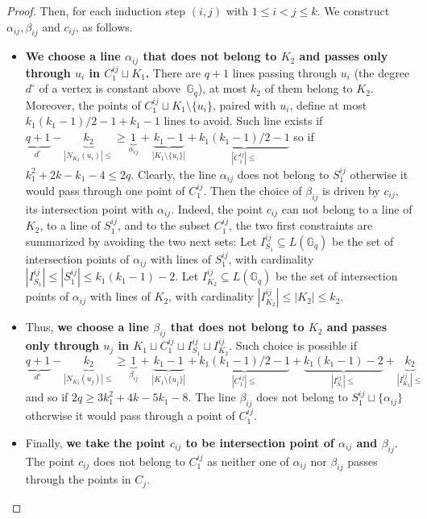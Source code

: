 \documentclass[a4paper,UKenglish,cleveref, autoref, thm-restate]{arxiv}
\newcommand{\ls}{\leqslant}
\newcommand{\gs}{\geqslant}
\newcommand{\G}[1][q]{\mathbb{G}_{#1}}
\begin{document}
\begin{proof}
        Then, for each induction step $(i,j)$ with $1 \ls i < j \ls k$. We construct $\alpha_{ij}, \beta_{ij}$ and $c_{ij}$, as follows.
        \begin{itemize}
            \item \textbf{We choose a line $\alpha_{ij}$ that does not belong to $K_2$ and passes only through $u_i$ in $C_1^{ij}\sqcup K_1 $.}
            There are $q+1$ lines passing through $u_i$ (the degree $d^\circ$ of a vertex is constant above~$\G$), at most $k_2$ of them belong to $K_2$. Moreover, the points of $C_1^{ij} \sqcup K_1 \setminus \{u_i\}$, paired with $u_i$, define at most $k_1(k_1-1)/2-1+ k_1 - 1 $ lines to avoid. Such line exists if \\ $\underbrace{q+1}_{d^\circ}- \underbrace{k_2}_{|N_{K_2}(u_i)|\ls} \gs \underbrace{1}_{\alpha_{ij}} + \underbrace{k_1 - 1}_{|K_1 \setminus \{u_i\}|} + \underbrace{k_1(k_1 - 1) /2 - 1}_{|C_1^{ij}|\ls}$ so if $k_1^2+2k-k_1-4\ls 2q$. Clearly, the line $\alpha_{ij}$ does not belong to $S_1^{ij}$ otherwise it would pass through one point of $C_1^{ij}$. Then the choice of $\beta_{ij}$ is driven by  $c_{ij}$, its intersection point with $\alpha_{ij}$. Indeed, the point $c_{ij}$ can not belong to a line of $K_2$, to a line of $S_1^{ij}$, and to the subset $C_1^{ij}$, the two first constraints are summarized by avoiding the two next sets:
            Let $I_{S_1}^{ij} \subseteq L(\G)$ be the set of intersection points of $\alpha_{ij}$ with lines of $S_1^{ij}$, with cardinality $|I_{S_1}^{ij}| \ls |S_1^{ij}| \ls k_1(k_1-1) - 2$. 
            Let $I_{K_2}^{ij} \subseteq L(\G)$ be the set of intersection points of $\alpha_{ij}$ with lines of $K_2$, with cardinality $|I_{K_2}^{ij}| \ls |K_2| \ls k_2$. 
            \item Thus, \textbf{we choose a line $\beta_{ij}$ that does not belong to $K_2$ and passes only through $u_j$ in $ K_1 \sqcup C_1^{ij} \sqcup I_{S_1}^{ij} \sqcup I_{K_2}^{ij}$}. Such choice is possible if
                  \[\underbrace{q+1}_{d^\circ} - \underbrace{k_2}_{|N_{K_2}(u_j)|\ls} \gs \underbrace{1}_{\beta_{ij}} + \underbrace{k_1 - 1}_{|K_1 \setminus \{u_j\}|} + \underbrace{k_1(k_1 - 1) /2 - 1}_{|C_1^{ij}|\ls} + \underbrace{k_1(k_1 - 1) - 2}_{|I_{S_1}^{ij}|\ls} + \underbrace{k_2}_{|I_{K_2}^{ij}|\ls} \]
                  and so if $2q \gs 3k_1^2+4k-5k_1-8$. The line $\beta_{ij}$ does not belong to $S_1^{ij} \sqcup \{\alpha_{ij}\}$ otherwise it would pass through a point of $C_1^{ij}$. 
            \item Finally, \textbf{we take the point $c_{ij}$ to be intersection point of $\alpha_{ij}$ and $\beta_{ij}$}. The point $c_{ij}$ does not belong to $C_1^{ij}$ as neither one of $\alpha_{ij}$ nor $\beta_{ij}$ passes through the points in $C_j$.

\end{itemize}
\end{proof}
\end{document}
